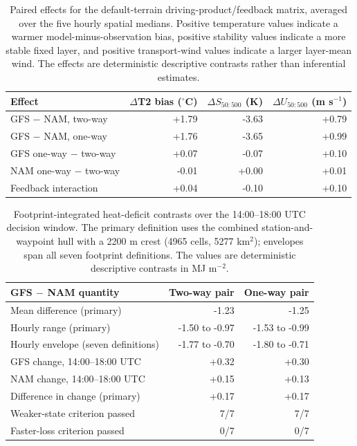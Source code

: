 \documentclass[air,article,submit,moreauthors]{Definitions/mdpi}
\begin{document}
\begin{table}[H]
\caption{Paired effects for the default-terrain driving-product/feedback matrix, averaged over the five hourly spatial medians.
Positive temperature values indicate a warmer model-minus-observation bias, positive stability values indicate a more stable fixed layer, and positive transport-wind values indicate a larger layer-mean wind.
The effects are deterministic descriptive contrasts rather than inferential estimates.}
\label{tab:v3-effects}
\centering
\begin{tabular}{lrrr}
\toprule
Effect & $\Delta$T2 bias ($^{\circ}$C) & $\Delta S_{50:500}$ (K) & $\Delta U_{50:500}$ (m s$^{-1}$) \\
\midrule
GFS $-$ NAM, two-way & +1.79 & -3.63 & +0.79 \\
GFS $-$ NAM, one-way & +1.76 & -3.65 & +0.99 \\
GFS one-way $-$ two-way & +0.07 & -0.07 & +0.10 \\
NAM one-way $-$ two-way & -0.01 & +0.00 & +0.01 \\
Feedback interaction & +0.04 & -0.10 & +0.10 \\
\bottomrule
\end{tabular}
\end{table}

\begin{table}[H]
\caption{Footprint-integrated heat-deficit contrasts over the 14:00--18:00 UTC decision window.
The primary definition uses the combined station-and-waypoint hull with a 2200 m crest (4965 cells, 5277 km$^{2}$); envelopes span all seven footprint definitions.
The values are deterministic descriptive contrasts in MJ m$^{-2}$.}
\label{tab:v3-heatdeficit}
\centering
\begin{tabular}{lrr}
\toprule
GFS $-$ NAM quantity & Two-way pair & One-way pair \\
\midrule
Mean difference (primary) & -1.23 & -1.25 \\
Hourly range (primary) & -1.50 to -0.97 & -1.53 to -0.99 \\
Hourly envelope (seven definitions) & -1.77 to -0.70 & -1.80 to -0.71 \\
GFS change, 14:00--18:00 UTC & +0.32 & +0.30 \\
NAM change, 14:00--18:00 UTC & +0.15 & +0.13 \\
Difference in change (primary) & +0.17 & +0.17 \\
Weaker-state criterion passed & 7/7 & 7/7 \\
Faster-loss criterion passed & 0/7 & 0/7 \\
\bottomrule
\end{tabular}
\end{table}
\end{document}
